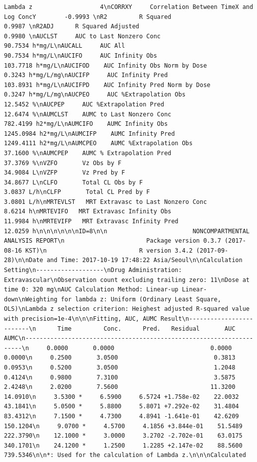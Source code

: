 \documentclass[]{krantz}
\theoremstyle{definition}
\theoremstyle{definition}
\theoremstyle{definition}
\theoremstyle{remark}
\begin{document}
\begin{verbatim}
Lambda z                   4\nCORRXY     Correlation Between TimeX and Log ConcY        -0.9993 \nR2         R Squared                                       0.9987 \nR2ADJ      R Squared Adjusted                              0.9980 \nAUCLST     AUC to Last Nonzero Conc                       90.7534 h*mg/L\nAUCALL     AUC All                                        90.7534 h*mg/L\nAUCIFO     AUC Infinity Obs                              103.7718 h*mg/L\nAUCIFOD    AUC Infinity Obs Norm by Dose                   0.3243 h*mg/L/mg\nAUCIFP     AUC Infinity Pred                             103.8931 h*mg/L\nAUCIFPD    AUC Infinity Pred Norm by Dose                  0.3247 h*mg/L/mg\nAUCPEO     AUC %Extrapolation Obs                         12.5452 %\nAUCPEP     AUC %Extrapolation Pred                        12.6474 %\nAUMCLST    AUMC to Last Nonzero Conc                     782.4199 h2*mg/L\nAUMCIFO    AUMC Infinity Obs                            1245.0984 h2*mg/L\nAUMCIFP    AUMC Infinity Pred                           1249.4111 h2*mg/L\nAUMCPEO    AUMC %Extrapolation Obs                        37.1600 %\nAUMCPEP    AUMC % Extrapolation Pred                      37.3769 %\nVZFO       Vz Obs by F                                    34.9084 L\nVZFP       Vz Pred by F                                   34.8677 L\nCLFO       Total CL Obs by F                               3.0837 L/h\nCLFP       Total CL Pred by F                              3.0801 L/h\nMRTEVLST   MRT Extravasc to Last Nonzero Conc              8.6214 h\nMRTEVIFO   MRT Extravasc Infinity Obs                     11.9984 h\nMRTEVIFP   MRT Extravasc Infinity Pred                    12.0259 h\n\n\n\n\n\nID=8\n\n                        NONCOMPARTMENTAL ANALYSIS REPORT\n                       Package version 0.3.7 (2017-08-16 KST)\n                          R version 3.4.2 (2017-09-28)\n\nDate and Time: 2017-10-19 17:48:22 Asia/Seoul\n\nCalculation Setting\n-------------------\nDrug Administration: Extravascular\nObservation count excluding trailing zero: 11\nDose at time 0: 320 mg\nAUC Calculation Method: Linear-up Linear-down\nWeighting for lambda z: Uniform (Ordinary Least Square, OLS)\nLambda z selection criterion: Heighest adjusted R-squared value with precision=1e-4\n\n\nFitting, AUC, AUMC Result\n-------------------------\n      Time         Conc.      Pred.   Residual       AUC       AUMC\n---------------------------------------------------------------------\n     0.0000       0.0000                           0.0000     0.0000\n     0.2500       3.0500                           0.3813     0.0953\n     0.5200       3.0500                           1.2048     0.4124\n     0.9800       7.3100                           3.5875     2.4248\n     2.0200       7.5600                          11.3200    14.0910\n     3.5300 *     6.5900     6.5724 +1.758e-02    22.0032    43.1841\n     5.0500 *     5.8800     5.8071 +7.292e-02    31.4804    83.4312\n     7.1500 *     4.7300     4.8941 -1.641e-01    42.6209   150.1204\n     9.0700 *     4.5700     4.1856 +3.844e-01    51.5489   222.3790\n    12.1000 *     3.0000     3.2702 -2.702e-01    63.0175   340.1701\n    24.1200 *     1.2500     1.2285 +2.147e-02    88.5600   739.5346\n\n*: Used for the calculation of Lambda z.\n\n\nCalculated 
\end{verbatim}
\end{document}
